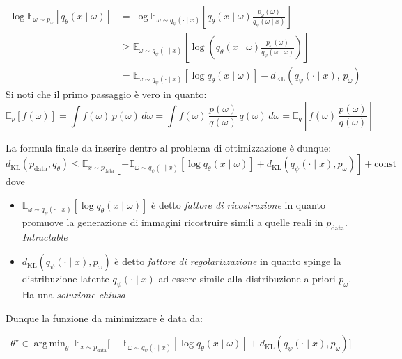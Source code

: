 \begin{align*}
	\log \mathbb{E}_{\omega \sim p_\omega} [q_\theta(x \mid \omega)]
	 & = \log \mathbb{E}_{\omega \sim q_\psi(\cdot \mid x)} \left[ q_\theta(x \mid \omega) \frac{p_\omega(\omega)}{q_\psi(\omega \mid x)} \right] \\[2ex]
	 & \geq \mathbb{E}_{\omega \sim q_\psi(\cdot \mid x)} \left[
		\log \left(
		q_\theta(x \mid \omega) \frac{p_\omega(\omega)}{q_\psi(\omega \mid x)}
		\right)
	\right]                                                                                                                                       \\[2ex]
	 & = \mathbb{E}_{\omega \sim q_\psi(\cdot \mid x)} \left[ \log q_\theta(x \mid \omega) \right]
	- d_{\mathrm{KL}}(q_\psi(\cdot \mid x),\, p_\omega)
\end{align*}
Si noti che il primo passaggio è vero in quanto:
\[
	\mathbb{E}_{p} \left[f \left(\omega\right)\right]
	= \int f \left(\omega\right)\, p \left(\omega\right)\, d\omega
	= \int f \left(\omega\right)\, \frac{p \left(\omega\right)}{q \left(\omega\right)}\, q \left(\omega\right)\, d\omega
	= \mathbb{E}_{q} \left[ f \left(\omega\right)\, \frac{p \left(\omega\right)}{q \left(\omega\right)} \right]
\]

La formula finale da inserire dentro al problema di ottimizzazione è dunque:
\[
	d_{\mathrm{KL}} \left(p_{\text{data}}, q_{\theta}\right)
	\le \mathbb{E}_{x \sim p_{\text{data}}} \left[
	-\mathbb{E}_{\omega \sim q_{\psi} \left(\cdot \mid x\right)} \left[ \log q_{\theta} \left(x \mid \omega\right) \right]
	+ d_{\mathrm{KL}} \left( q_{\psi} \left(\cdot \mid x\right), p_{\omega} \right)
	\right] + \text{const}
\]
dove
\begin{itemize}
	\item $\mathbb{E}_{\omega \sim q_{\psi} \left(\cdot \mid x\right)} \left[ \log q_{\theta} \left(x \mid \omega\right) \right] $ è detto \textit{fattore di ricostruzione} in quanto promuove la generazione di immagini ricostruire simili a quelle reali in $ p_{\text{data}} $. \textit{Intractable}
	\item $	d_{\mathrm{KL}} \left( q_{\psi} \left(\cdot \mid x\right), p_{\omega} \right) $ è detto \textit{fattore di regolarizzazione} in quanto spinge la distribuzione latente $ q_\psi(\cdot \mid x) $ ad essere simile alla distribuzione a priori $ p_\omega $. Ha una \textit{soluzione chiusa}
\end{itemize}
Dunque la funzione da minimizzare è data da:
\begin{tcolorbox}
	\[
		\theta^{\star} \in \operatorname{arg\,min}_{\theta}\;
		\mathbb{E}_{x \sim p_{\text{data}}} \big[
		-\mathbb{E}_{\omega \sim q_{\psi} \left(\cdot \mid x\right)} \left[ \log q_{\theta} \left(x \mid \omega\right) \right]
		+ d_{\mathrm{KL}} \left( q_{\psi} \left(\cdot \mid x\right), p_{\omega} \right) \big]
	\]
\end{tcolorbox}

